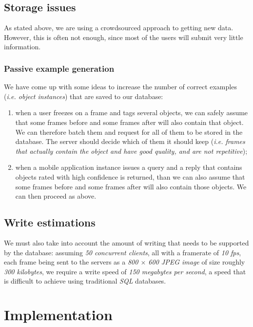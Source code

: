 \documentclass[a4paper,onecolumn,oneside,titlepage,11pt]{report}
\begin{document}
\section{Storage issues}

As stated above, we are using a crowdsourced approach to getting new data. However, this is often not enough, since most of the users will submit very little information.

\subsection{Passive example generation}

We have come up with some ideas to increase the number of correct examples (\emph{i.e. object instances}) that are saved to our database:
\begin{enumerate}
	\item when a user freezes on a frame and tags several objects, we can safely assume that some frames before and some frames after will also contain that object. We can therefore batch them and request for all of them to be stored in the database. The server should decide which of them it should keep (\emph{i.e. frames that actually contain the object and have good quality, and are not repetitive});
	\item when a mobile application instance issues a query and a reply that contains objects rated with high confidence is returned, than we can also assume that some frames before and some frames after will also contain those objects. We can then proceed as above.
\end{enumerate}

\section{Write estimations}
We must also take into account the amount of writing that needs to be supported by the database: assuming \emph{50 concurrent clients}, all with a framerate of \emph{10 fps}, each frame being sent to the servers as a \emph{800 $\times$ 600 JPEG image} of size roughly \emph{300 kilobytes}, we require a write speed of \emph{150 megabytes per second}, a speed that is difficult to achieve using traditional \emph{SQL} databases.


\chapter{Implementation}
\label{chap:implementation}
\end{document}
